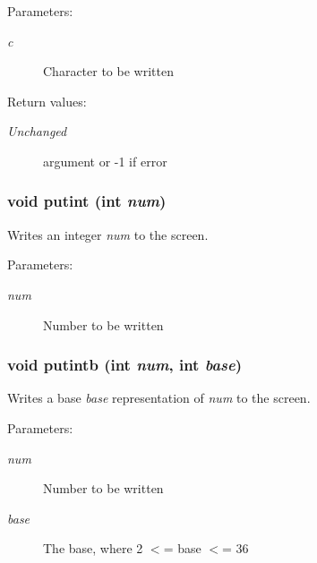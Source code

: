 \begin{Desc}
\item[Parameters: ]\par
\begin{description}
\item[{\em 
c}]Character to be written \end{description}
\end{Desc}
\begin{Desc}
\item[Return values: ]\par
\begin{description}
\item[{\em 
Unchanged}]argument or -1 if error \end{description}
\end{Desc}
\subsubsection{\setlength{\rightskip}{0pt plus 5cm}void putint (int {\em num})}\label{hpconio_8h_a5}


Writes an integer {\em num} to the screen.

\begin{Desc}
\item[Parameters: ]\par
\begin{description}
\item[{\em 
num}]Number to be written \end{description}
\end{Desc}
\subsubsection{\setlength{\rightskip}{0pt plus 5cm}void putintb (int {\em num}, int {\em base})}\label{hpconio_8h_a6}


Writes a base {\em base} representation of {\em num} to the screen.

\begin{Desc}
\item[Parameters: ]\par
\begin{description}
\item[{\em 
num}]Number to be written \item[{\em 
base}]The base, where 2 $<$= base $<$= 36 \end{description}
\end{Desc}
